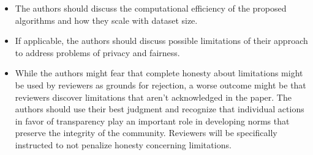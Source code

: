 \begin{enumerate}
\begin{itemize}
        \item The authors should discuss the computational efficiency of the proposed algorithms and how they scale with dataset size.
        \item If applicable, the authors should discuss possible limitations of their approach to address problems of privacy and fairness.
        \item While the authors might fear that complete honesty about limitations might be used by reviewers as grounds for rejection, a worse outcome might be that reviewers discover limitations that aren't acknowledged in the paper. The authors should use their best judgment and recognize that individual actions in favor of transparency play an important role in developing norms that preserve the integrity of the community. Reviewers will be specifically instructed to not penalize honesty concerning limitations.
    \end{itemize}


\end{enumerate}
